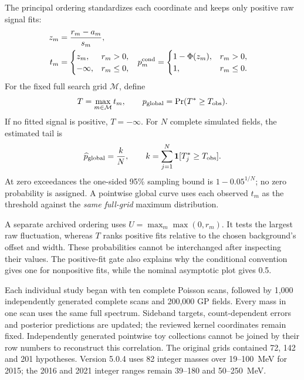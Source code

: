 The principal ordering standardizes each coordinate and keeps only
positive raw signal fits:
\begin{align}
 z_m&=\frac{r_m-a_m}{s_m},\\
 t_m&=\begin{cases}z_m,&r_m>0,\\-\infty,&r_m\leq0,\end{cases}
 &p_m^{\rm cond}&=\begin{cases}1-\Phi(z_m),&r_m>0,\\1,&r_m\leq0.\end{cases}
 \label{eq:v501-local-ordering}
\end{align}
For the fixed full search grid $\mathcal M$, define
\begin{equation}
 T=\max_{m\in\mathcal M}t_m,
 \qquad
 p_{\rm global}=\Pr(T^*\geq T_{\rm obs}).
 \label{v5-eq:global-ordering}
\end{equation}
If no fitted signal is positive, $T=-\infty$. For $N$ complete simulated
fields, the estimated tail is
\begin{equation}
 \widehat p_{\rm global}=\frac{k}{N},
 \qquad k=\sum_{j=1}^{N}\mathbf1[T_j^*\geq T_{\rm obs}].
 \label{eq:v501-global-mc-tail}
\end{equation}
At zero exceedances the one-sided 95\% sampling bound is
$1-0.05^{1/N}$; no zero probability is assigned. A pointwise global curve
uses each observed $t_m$ as the threshold against the \emph{same full-grid}
maximum distribution.

A separate archived ordering uses $U=\max_m\max(0,r_m)$. It tests the
largest raw fluctuation, whereas $T$ ranks positive fits relative to the
chosen background's offset and width. These probabilities cannot be
interchanged after inspecting their values. The positive-fit gate also
explains why the conditional convention gives one for nonpositive fits,
while the nominal asymptotic plot gives 0.5.

Each individual study began with ten complete Poisson scans, followed by
1,000 independently generated complete scans and 200,000 GP fields.
Every mass in one scan uses the same full spectrum. Sideband targets,
count-dependent errors and posterior predictions are updated; the reviewed
kernel coordinates remain fixed. Independently generated pointwise toy
collections cannot be joined by their row numbers to reconstruct this
correlation. The original grids contained 72, 142 and 201 hypotheses.
Version 5.0.4 uses 82 integer masses over 19--100~MeV for 2015; the
2016 and 2021 integer ranges remain 39--180 and 50--250~MeV.

